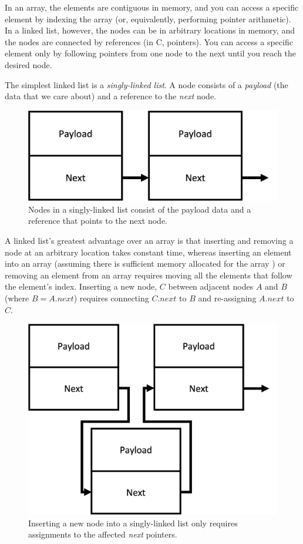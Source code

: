 In an array, the elements are contiguous in memory, and you can access a specific element by indexing the array (or, equivalently, performing pointer arithmetic).
In a linked list, however, the nodes can be in arbitrary locations in memory, and the nodes are connected by references (in C, pointers).
You can access a specific element only by following pointers from one node to the next until you reach the desired node.

The simplest linked list is a \textit{singly-linked list}.
A node consists of a \textit{payload} (the data that we care about) and a reference to the \textit{next} node.

\begin{figure}[h]
    \centering
    \includegraphics[scale=0.5]{singly-linked-list}
    \caption{Nodes in a singly-linked list consist of the payload data and a reference that points to the next node.}
\end{figure}

A linked list's greatest advantage over an array is that inserting and removing a node at an arbitrary location takes constant time, whereas inserting an element into an array (assuming there is sufficient memory allocated for the array ) or removing an element from an array requires moving all the elements that follow the element's index.
Inserting a new node, $C$ between adjacent nodes $A$ and $B$ (where $B = A.next$) requires connecting $C.next$ to $B$ and re-assigning $A.next$ to $C$.

\begin{figure}[h]
    \centering
    \includegraphics[scale=0.5]{sll-insertion}
    \caption{Inserting a new node into a singly-linked list only requires assignments to the affected \textit{next} pointers.}
\end{figure}

